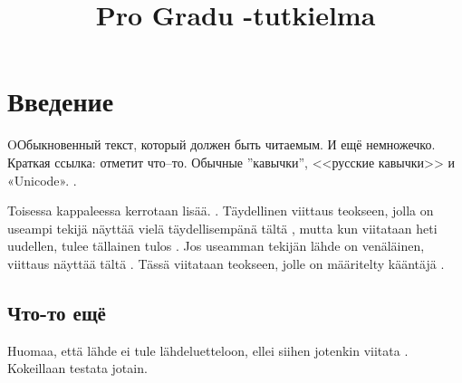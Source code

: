 \documentclass[12pt,a4paper]{article}
\title{Pro Gradu -tutkielma}
\begin{document}


\tableofcontents

\pagebreak


\section{Введение}

OОбыкновенный текст, который должен быть читаемым. И ещё немножечко. Краткая ссылка: \textcite[150--152]{kobrinski2013} отметит что–то. Обычные ''кавычки'', <<русские кавычки>> и «Unicode». \parencite[200]{kobrinski2013}.

Toisessa kappaleessa kerrotaan lisää. \parencite{shapir2007}. Täydellinen viittaus teokseen,
jolla on useampi tekijä näyttää vielä täydellisempänä
tältä \parencite[][268]{SKS2007}, mutta kun viitataan heti uudellen, tulee tällainen tulos
\parencite[50]{SKS2007}. Jos useamman tekijän lähde on venäläinen, viittaus näyttää tältä
\parencite{ljustrova1976}. Tässä viitataan teokseen, jolle on määritelty kääntäjä
\parencite[25]{ref:sologub1918}.

\subsection{Что-то ещё}

Huomaa, että lähde ei tule lähdeluetteloon, ellei siihen jotenkin
viitata \parencite[55]{artjunova1983}. Kokeillaan testata jotain.


\printbibliography[heading=bibintoc,title={Список использоваемой литературы}]
\end{document}
